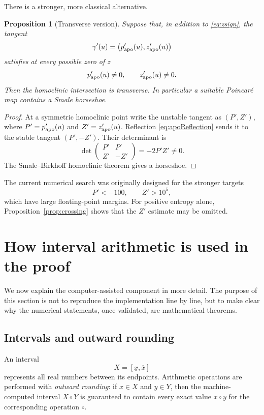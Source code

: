 \documentclass[11pt]{article}
\newtheorem{proposition}[theorem]{Proposition}
\begin{document}
There is a stronger, more classical alternative.

\begin{proposition}[Transverse version]\label{prop:transverse}
Suppose that, in addition to \eqref{eq:zsign}, the tangent
\[
 \gamma'(u)=\bigl(p_{\rm apo}'(u),z_{\rm apo}'(u)\bigr)
\]
satisfies at every possible zero of $z$
\[
 p_{\rm apo}'(u)\ne0,\qquad z_{\rm apo}'(u)\ne0.
\]
Then the homoclinic intersection is transverse.  In particular a suitable
Poincar\'e map contains a Smale horseshoe.
\end{proposition}

\begin{proof}
At a symmetric homoclinic point write the unstable tangent as $(P',Z')$,
where $P'=p_{\rm apo}'(u)$ and $Z'=z_{\rm apo}'(u)$.  Reflection
\eqref{eq:apoReflection} sends it to the stable tangent $(P',-Z')$.  Their
determinant is
\[
 \det
 \begin{pmatrix}
 P'&P'\\
 Z'&-Z'
 \end{pmatrix}
 =
 -2P'Z'\ne0.
\]
The Smale--Birkhoff homoclinic theorem gives a horseshoe.
\end{proof}

The current numerical search was originally designed for the stronger
targets
\begin{equation}\label{eq:strongtargets}
 P'<-100,\qquad
 Z'>10^5,
\end{equation}
which have large floating-point margins.  For positive entropy alone,
Proposition~\ref{prop:crossing} shows that the $Z'$ estimate may be omitted.

\section{How interval arithmetic is used in the proof}\label{sec:interval}

We now explain the computer-assisted component in more detail.  The purpose
of this section is not to reproduce the implementation line by line, but to
make clear why the numerical statements, once validated, are mathematical
theorems.

\subsection{Intervals and outward rounding}

An interval
\[
 X=[\underline x,\overline x]
\]
represents all real numbers between its endpoints.  Arithmetic operations are
performed with \emph{outward rounding}: if $x\in X$ and $y\in Y$, then the
machine-computed interval $X\circ Y$ is guaranteed to contain every exact
value $x\circ y$ for the corresponding operation $\circ$.
\end{document}
